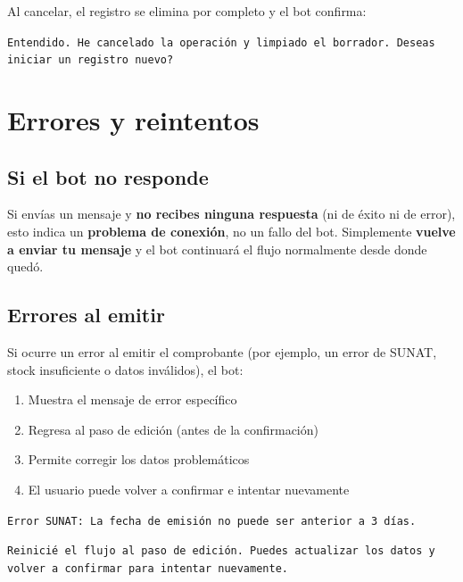\documentclass[12pt,a4paper]{article}
\begin{document}
Al cancelar, el registro se elimina por completo y el bot confirma:

\begin{mensajebot}
\texttt{Entendido. He cancelado la operaci\'on y limpiado el borrador. Deseas iniciar un registro nuevo?}
\end{mensajebot}

\section{Errores y reintentos}

\subsection{Si el bot no responde}

Si env\'ias un mensaje y \textbf{no recibes ninguna respuesta} (ni de \'exito ni de error), esto indica un \textbf{problema de conexi\'on}, no un fallo del bot. Simplemente \textbf{vuelve a enviar tu mensaje} y el bot continuar\'a el flujo normalmente desde donde qued\'o.

\subsection{Errores al emitir}

Si ocurre un error al emitir el comprobante (por ejemplo, un error de SUNAT, stock insuficiente o datos inv\'alidos), el bot:

\begin{enumerate}
    \item Muestra el mensaje de error espec\'ifico
    \item Regresa al paso de edici\'on (antes de la confirmaci\'on)
    \item Permite corregir los datos problem\'aticos
    \item El usuario puede volver a confirmar e intentar nuevamente
\end{enumerate}

\begin{mensajebot}
\texttt{Error SUNAT: La fecha de emisi\'on no puede ser anterior a 3 d\'ias.}

\medskip
\texttt{Reinici\'e el flujo al paso de edici\'on. Puedes actualizar los datos y volver a confirmar para intentar nuevamente.}
\end{mensajebot}
\end{document}
